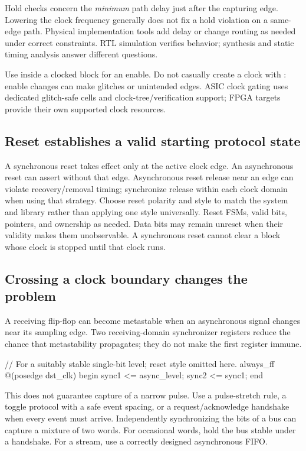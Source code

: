 \documentclass[11pt]{article}
\newcommand{\cd}[1]{{\frenchspacing\texttt{\detokenize{#1}}}}
\begin{document}
Hold checks concern the \emph{minimum} path delay just after the capturing edge.
Lowering the clock frequency generally does not fix a hold violation on a same-edge path.
Physical implementation tools add delay or change routing as needed under correct constraints.
RTL simulation verifies behavior; synthesis and static timing analysis answer different questions.

Use \cd{if (enable)} inside a clocked block for an enable.
Do not casually create a clock with \cd{clk & enable}: enable changes can make glitches or unintended edges.
ASIC clock gating uses dedicated glitch-safe cells and clock-tree/verification support; FPGA targets provide their own supported clock resources.

\subsection{Reset establishes a valid starting protocol state}
A synchronous reset takes effect only at the active clock edge. An asynchronous reset can assert without that edge.
Asynchronous reset release near an edge can violate recovery/removal timing; synchronize release within each clock domain when using that strategy.
Choose reset polarity and style to match the system and library rather than applying one style universally.
Reset FSMs, valid bits, pointers, and ownership as needed. Data bits may remain unreset when their validity makes them unobservable.
A synchronous reset cannot clear a block whose clock is stopped until that clock runs.

\subsection{Crossing a clock boundary changes the problem}
A receiving flip-flop can become metastable when an asynchronous signal changes near its sampling edge.
Two receiving-domain synchronizer registers reduce the chance that metastability propagates; they do not make the first register immune.
\par\noindent\begin{minipage}{\linewidth}
\begin{svcode}
// For a suitably stable single-bit level; reset style omitted here.
always_ff @(posedge dst_clk) begin
    sync1 <= async_level;
    sync2 <= sync1;
end
\end{svcode}
\end{minipage}\par
This does not guarantee capture of a narrow pulse. Use a pulse-stretch rule, a toggle protocol with a safe event spacing,
or a request/acknowledge handshake when every event must arrive.
Independently synchronizing the bits of a bus can capture a mixture of two words.
For occasional words, hold the bus stable under a handshake. For a stream, use a correctly designed asynchronous FIFO.
\end{document}
